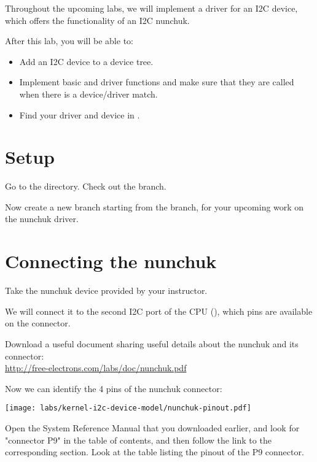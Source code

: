 
Throughout the upcoming labs, we will implement a driver for an I2C
device, which offers the functionality of an I2C nunchuk.

After this lab, you will be able to:

\begin{itemize}
\item Add an I2C device to a device tree.
\item Implement basic  and  driver
functions and make sure that they are called when there is a
device/driver match.
\item Find your driver and device in .
\end{itemize}

\section{Setup}

Go to the  directory. Check out the
 branch.

Now create a new  branch starting from the
 branch,  for your upcoming work on the nunchuk
driver.

\section{Connecting the nunchuk}

Take the nunchuk device provided by your instructor.

We will connect it to the second I2C port of the CPU (),
which pins are available on the  connector.

Download a useful document sharing useful details about the nunchuk
and its connector:\\
\url{http://free-electrons.com/labs/doc/nunchuk.pdf}

Now we can identify the 4 pins of the nunchuk connector:

\begin{center}
\texttt{[image: labs/kernel-i2c-device-model/nunchuk-pinout.pdf]}
\end{center}

Open the System Reference Manual that you downloaded earlier,
and look for "connector P9" in the table of contents, and then
follow the link to the corresponding section. Look at the table listing
the pinout of the P9 connector.

